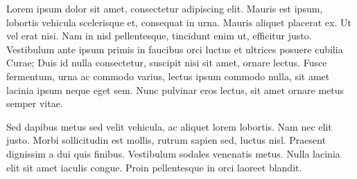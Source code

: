 
Lorem ipsum dolor sit amet, consectetur adipiscing elit. Mauris est ipsum, lobortis vehicula scelerisque et, consequat in urna. Mauris aliquet placerat ex. Ut vel erat nisi. Nam in nisl pellentesque, tincidunt enim ut, efficitur justo. Vestibulum ante ipsum primis in faucibus orci luctus et ultrices posuere cubilia Curae; Duis id nulla consectetur, suscipit nisi sit amet, ornare lectus. Fusce fermentum, urna ac commodo varius, lectus ipsum commodo nulla, sit amet lacinia ipsum neque eget sem. Nunc pulvinar eros lectus, sit amet ornare metus semper vitae.

Sed dapibus metus sed velit vehicula, ac aliquet lorem lobortis. Nam nec elit justo. Morbi sollicitudin est mollis, rutrum sapien sed, luctus nisl. Praesent dignissim a dui quis finibus. Vestibulum sodales venenatis metus. Nulla lacinia elit sit amet iaculis congue. Proin pellentesque in orci laoreet blandit.

